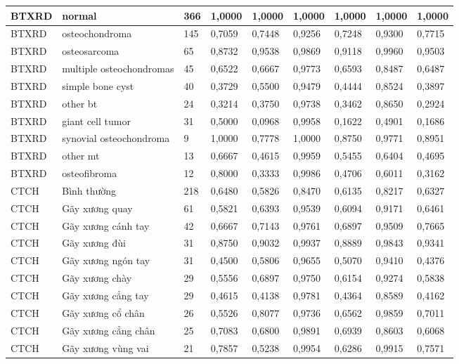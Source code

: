 \begin{landscape}
\begin{longtable}{|C{1.35cm}|L{4.25cm}|C{0.75cm}|C{1.35cm}|C{1.35cm}|C{1.45cm}|C{1.25cm}|C{1.25cm}|C{1.25cm}|}
BTXRD & normal & 366 & 1,0000 & 1,0000 & 1,0000 & 1,0000 & 1,0000 & 1,0000 \\
\hline
BTXRD & osteochondroma & 145 & 0,7059 & 0,7448 & 0,9256 & 0,7248 & 0,9300 & 0,7715 \\
\hline
BTXRD & osteosarcoma & 65 & 0,8732 & 0,9538 & 0,9869 & 0,9118 & 0,9960 & 0,9503 \\
\hline
BTXRD & multiple osteochondromas & 45 & 0,6522 & 0,6667 & 0,9773 & 0,6593 & 0,8487 & 0,6487 \\
\hline
BTXRD & simple bone cyst & 40 & 0,3729 & 0,5500 & 0,9479 & 0,4444 & 0,8524 & 0,3897 \\
\hline
BTXRD & other bt & 24 & 0,3214 & 0,3750 & 0,9738 & 0,3462 & 0,8650 & 0,2924 \\
\hline
BTXRD & giant cell tumor & 31 & 0,5000 & 0,0968 & 0,9958 & 0,1622 & 0,4901 & 0,1686 \\
\hline
BTXRD & synovial osteochondroma & 9 & 1,0000 & 0,7778 & 1,0000 & 0,8750 & 0,9771 & 0,8951 \\
\hline
BTXRD & other mt & 13 & 0,6667 & 0,4615 & 0,9959 & 0,5455 & 0,6404 & 0,4695 \\
\hline
BTXRD & osteofibroma & 12 & 0,8000 & 0,3333 & 0,9986 & 0,4706 & 0,6011 & 0,3162 \\
\hline
CTCH & Bình thường & 218 & 0,6480 & 0,5826 & 0,8470 & 0,6135 & 0,8217 & 0,6327 \\
\hline
CTCH & Gãy xương quay & 61 & 0,5821 & 0,6393 & 0,9539 & 0,6094 & 0,9171 & 0,6461 \\
\hline
CTCH & Gãy xương cánh tay & 42 & 0,6667 & 0,7143 & 0,9761 & 0,6897 & 0,9509 & 0,7665 \\
\hline
CTCH & Gãy xương đùi & 31 & 0,8750 & 0,9032 & 0,9937 & 0,8889 & 0,9843 & 0,9341 \\
\hline
CTCH & Gãy xương ngón tay & 31 & 0,4500 & 0,5806 & 0,9655 & 0,5070 & 0,9410 & 0,4376 \\
\hline
CTCH & Gãy xương chày & 29 & 0,5556 & 0,6897 & 0,9750 & 0,6154 & 0,9274 & 0,5838 \\
\hline
CTCH & Gãy xương cẳng tay & 29 & 0,4615 & 0,4138 & 0,9781 & 0,4364 & 0,8589 & 0,4162 \\
\hline
CTCH & Gãy xương cổ chân & 26 & 0,5526 & 0,8077 & 0,9736 & 0,6562 & 0,9859 & 0,7011 \\
\hline
CTCH & Gãy xương cẳng chân & 25 & 0,7083 & 0,6800 & 0,9891 & 0,6939 & 0,8603 & 0,6068 \\
\hline
CTCH & Gãy xương vùng vai & 21 & 0,7857 & 0,5238 & 0,9954 & 0,6286 & 0,9915 & 0,7571 \\

\end{longtable}
\end{landscape}
